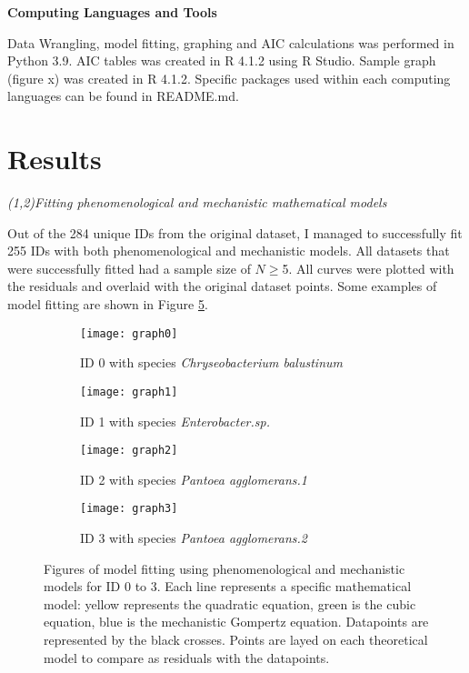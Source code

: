 \documentclass[11pt]{article}
\begin{document}
\noindent\textbf{Computing Languages and Tools}

Data Wrangling, model fitting, graphing and AIC calculations was performed in Python 3.9. AIC tables was created in R 4.1.2 
using R Studio. Sample graph (figure x) was created in R 4.1.2. Specific packages used within each computing languages can 
be found in README.md.

\section{Results}

\noindent\emph{(1,2)Fitting phenomenological and mechanistic mathematical models}

Out of the 284 unique IDs from the original dataset, I managed to successfully fit 255 IDs with both phenomenological and mechanistic
models. All datasets that were successfully fitted had a sample size of $N\geq$5. All curves were plotted with the residuals and 
overlaid with the original dataset points. Some examples of model fitting are shown in Figure \ref{fig:fig2}.

\begin{figure}[ht]
    \begin{subfigure}[b]{0.5\linewidth}
        \centering
        \texttt{[image: graph0]}
        \caption{ID 0 with species \emph{Chryseobacterium balustinum} \cite{bae_growth_2014}}
        \label{fig2:a}
        \vspace{4ex}
    \end{subfigure}%
    \begin{subfigure}[b]{0.5\linewidth}
        \centering
        \texttt{[image: graph1]}
        \caption{ID 1 with species \emph{Enterobacter.sp.} \cite{bae_growth_2014}}
        \label{fig2:b}
        \vspace{4ex}
    \end{subfigure}
    \begin{subfigure}[b]{0.5\linewidth}
        \centering
        \texttt{[image: graph2]}
        \caption{ID 2 with species \emph{Pantoea agglomerans.1} \cite{bae_growth_2014}}
        \label{fig2:c}
        \vspace{4ex}
    \end{subfigure}%
    \begin{subfigure}[b]{0.5\linewidth}
        \centering
        \texttt{[image: graph3]}
        \caption{ID 3 with species \emph{Pantoea agglomerans.2} \cite{bae_growth_2014}}
        \label{fig2:d}
        \vspace{4ex}  
    \end{subfigure}
    \caption{Figures of model fitting using phenomenological and mechanistic models for ID 0 to 3. Each line represents a specific mathematical model: yellow represents the quadratic equation,
    green is the cubic equation, blue is the mechanistic Gompertz equation. Datapoints are represented by the black crosses. Points are layed on each theoretical model to compare as residuals with the datapoints.}
    \label{fig:fig2}
\end{figure}
\end{document}
